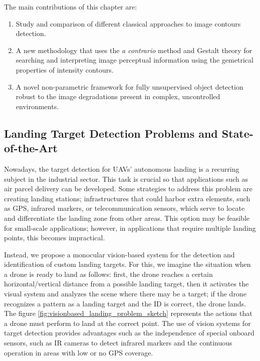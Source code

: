 The main contributions of this chapter are:

\begin{enumerate}
	\item Study and comparison of different classical approaches to image contours detection.
	\item A new methodology that uses the \textit{a contrario} method and Gestalt theory for searching and interpreting image perceptual information using the gemetrical properties of intensity contours.	
	\item A novel non-parametric framework for fully unsupervised object detection robust to the image degradations present in complex, uncontrolled environments.

\end{enumerate}

\subsection{Landing Target Detection Problems and State-of-the-Art}
Nowadays, the target detection for UAVs' autonomous landing is a recurring subject in the industrial sector. This task is crucial so that applications such as air parcel delivery can be developed. Some strategies to address this problem are creating landing stations; infrastructures that could harbor extra elements, such as GPS, infrared markers, or telecommunication sensors, which serve to locate and differentiate the landing zone from other areas. This option may be feasible for small-scale applications; however, in applications that require multiple landing points, this becomes impractical.

Instead, we propose a monocular vision-based system for the detection and identification of custom landing targets. For this, we imagine the situation when a drone is ready to land as follows: first, the drone reaches a certain horizontal/vertical distance from a possible landing target, then it activates the visual system and analyzes the scene where there may be a target; if the drone recognizes a pattern as a landing target and the ID is correct, the drone lands. The figure \ref{fig:visionbased_landing_problem_sketch} represents the actions that a drone must perform to land at the correct point. The use of vision systems for target detection provides advantages such as the independence of special onboard sensors, such as IR cameras to detect infrared markers and the continuous operation in areas with low or no GPS coverage.

